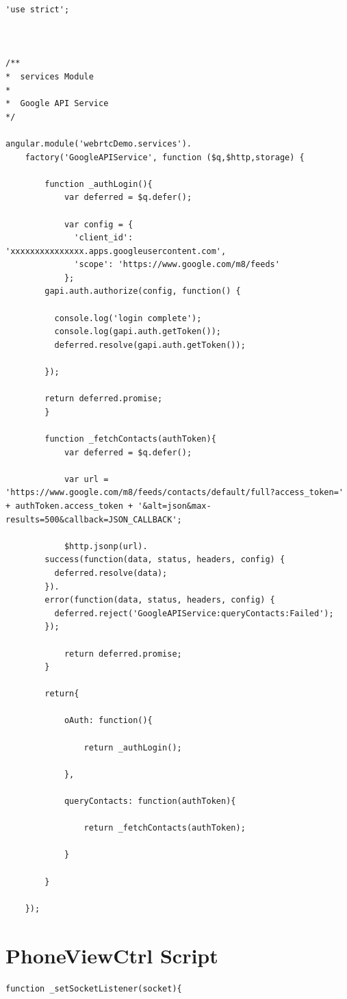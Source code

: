\begin{appendices}
\begin{lstlisting}[caption={GoogleAPIService.js in application client},label={code:google_api}]
'use strict';



/**
*  services Module
*
*  Google API Service
*/

angular.module('webrtcDemo.services').
	factory('GoogleAPIService', function ($q,$http,storage) {

		function _authLogin(){
			var deferred = $q.defer();

			var config = {
		      'client_id': 'xxxxxxxxxxxxxxx.apps.googleusercontent.com',
		      'scope': 'https://www.google.com/m8/feeds'
		    };
	    gapi.auth.authorize(config, function() {

	      console.log('login complete');
	      console.log(gapi.auth.getToken());
	      deferred.resolve(gapi.auth.getToken());

	    });

	    return deferred.promise;
		}

		function _fetchContacts(authToken){
			var deferred = $q.defer();

			var url = 'https://www.google.com/m8/feeds/contacts/default/full?access_token=' + authToken.access_token + '&alt=json&max-results=500&callback=JSON_CALLBACK';

			$http.jsonp(url).
	    success(function(data, status, headers, config) {
	      deferred.resolve(data);
	    }).
	    error(function(data, status, headers, config) {
	      deferred.reject('GoogleAPIService:queryContacts:Failed');
	    });

			return deferred.promise;
		}

		return{
			
			oAuth: function(){

				return _authLogin();
			
			},

			queryContacts: function(authToken){

				return _fetchContacts(authToken);

			}

		}

	});
\end{lstlisting}

\section{PhoneViewCtrl Script}
\label{app:phone_ctrl}

\begin{lstlisting}[caption={\_setSocketListener() Function in PhoneViewCtrl.js on Application Client},label={code:client_socket}]
function _setSocketListener(socket){


\end{lstlisting}
\end{appendices}
